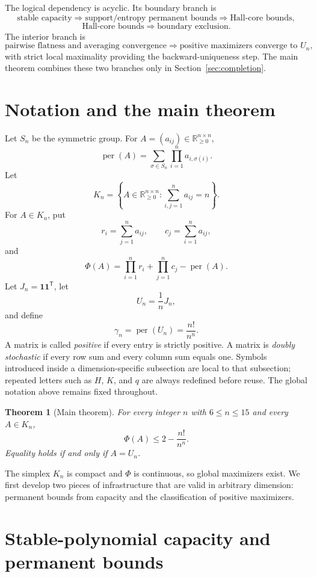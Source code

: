 \documentclass[11pt,a4paper]{article}
\numberwithin{equation}{section}
\newtheorem{theorem}{Theorem}[section]
\theoremstyle{definition}
\newcommand{\per}{\operatorname{per}}
\newcommand{\Rge}{\mathbb{R}_{\ge 0}}
\newcommand{\1}{\mathbf{1}}
\begin{document}
The logical dependency is acyclic.  Its boundary branch is
\[
 \boxed{\text{stable capacity}}
 \Longrightarrow
 \boxed{\text{support/entropy permanent bounds}}
 \Longrightarrow
 \boxed{\text{Hall-core bounds}},
\]
\[
 \boxed{\text{Hall-core bounds}}
 \Longrightarrow
 \boxed{\text{boundary exclusion}}.
\]
The interior branch is
\[
 \boxed{\text{pairwise flatness and averaging convergence}}
 \Longrightarrow
 \boxed{\text{positive maximizers converge to }U_n},
\]
with strict local maximality providing the backward-uniqueness step.
The main theorem combines these two branches only in
Section~\ref{sec:completion}.

\section{Notation and the main theorem}

Let $S_n$ be the symmetric group.  For $A=(a_{ij})\in\Rge^{n\times n}$,
\[
 \per(A)=\sum_{\sigma\in S_n}\prod_{i=1}^n a_{i,\sigma(i)}.
\]
Let
\[
 K_n=\left\{A\in\Rge^{n\times n}:\sum_{i,j=1}^n a_{ij}=n\right\}.
\]
For $A\in K_n$, put
\[
 r_i=\sum_{j=1}^n a_{ij},\qquad c_j=\sum_{i=1}^n a_{ij},
\]
and
\[
 \Phi(A)=\prod_{i=1}^n r_i+\prod_{j=1}^n c_j-\per(A).
\]
Let $J_n=\1\1^{\mathsf T}$, let
\[
 U_n=\frac1nJ_n,
\]
and define
\[
 \gamma_n=\per(U_n)=\frac{n!}{n^n}.
\]
A matrix is called \emph{positive} if every entry is strictly positive.  A matrix is \emph{doubly stochastic} if every row sum and every column sum equals one.
Symbols introduced inside a dimension-specific subsection are local to that
subsection; repeated letters such as $H$, $K$, and $q$ are always redefined
before reuse.  The global notation above remains fixed throughout.

\begin{theorem}[Main theorem]\label{thm:main}
For every integer $n$ with $6\le n\le15$ and every $A\in K_n$,
\[
 \Phi(A)\le 2-\frac{n!}{n^n}.
\]
Equality holds if and only if $A=U_n$.
\end{theorem}

The simplex $K_n$ is compact and $\Phi$ is continuous, so global maximizers exist.  We first develop two pieces of infrastructure that are valid in arbitrary dimension: permanent bounds from capacity and the classification of positive maximizers.

\section{Stable-polynomial capacity and permanent bounds}\label{sec:capacity}
\end{document}
